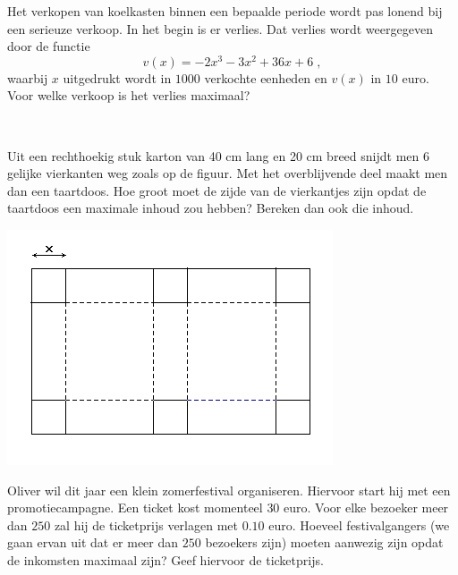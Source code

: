 \documentclass[12pt]{article}
\begin{document}
\begin{oefening}
  Het verkopen van koelkasten binnen een bepaalde periode wordt pas lonend bij een serieuze verkoop. In het begin is er verlies. Dat verlies wordt weergegeven door de functie
  $$v(x)=-2x^3-3x^2+36x+6\;,$$
  waarbij $x$ uitgedrukt wordt in $1000$ verkochte eenheden en $v(x)$ in $10$ euro. Voor welke verkoop is het verlies maximaal?
\end{oefening}

\begin{oefening}\\
  \begin{minipage}{0.6\textwidth}
    Uit een rechthoekig stuk karton van 40 cm lang en 20 cm breed snijdt men 6 gelijke
    vierkanten weg zoals op de figuur. Met het overblijvende deel maakt men dan een
    taartdoos. Hoe groot moet de zijde van de vierkantjes zijn opdat de taartdoos een
    maximale inhoud zou hebben? Bereken dan ook die inhoud.
  \end{minipage}
  \begin{minipage}{0.4\textwidth}
    \centering
    \includegraphics[width=\textwidth]{rechthoekig-stuk-karton}
  \end{minipage}
\end{oefening}

\begin{oefening}
  Oliver wil dit jaar een klein zomerfestival organiseren. Hiervoor start hij met een promotiecampagne. Een ticket kost momenteel $30$ euro. Voor elke bezoeker meer dan $250$ zal hij de ticketprijs verlagen met $0.10$ euro. Hoeveel festivalgangers (we gaan ervan uit dat er meer dan $250$ bezoekers zijn) moeten aanwezig zijn opdat de inkomsten maximaal zijn? Geef hiervoor de ticketprijs.
\end{oefening}
\end{document}

